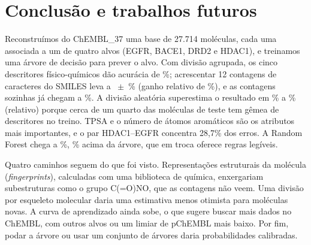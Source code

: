\section{Conclusão e trabalhos futuros}

Reconstruímos do ChEMBL\_37 uma base de 27.714 moléculas, cada uma associada a um de quatro alvos (EGFR, BACE1, DRD2 e HDAC1), e treinamos uma árvore de decisão para prever o alvo. Com divisão agrupada, os cinco descritores físico-químicos dão acurácia de \accGrupDesc\%; acrescentar 12 contagens de caracteres do SMILES leva a \accGrupAmbos~$\pm$~\sdGrupAmbos\% (ganho relativo de \ganhoAmbos\%), e as contagens sozinhas já chegam a \accGrupSmiles\%. A divisão aleatória superestima o resultado em \gapMin\% a \gapMax\% (relativo) porque cerca de um quarto das moléculas de teste tem gêmea de descritores no treino. TPSA e o número de átomos aromáticos são os atributos mais importantes, e o par HDAC1--EGFR concentra 28,7\% dos erros. A Random Forest chega a \accRF\%, \ganhoRF\% acima da árvore, que em troca oferece regras legíveis.

Quatro caminhos seguem do que foi visto. Representações estruturais da molécula (\emph{fingerprints}), calculadas com uma biblioteca de química, enxergariam subestruturas como o grupo C(=O)NO, que as contagens não veem. Uma divisão por esqueleto molecular daria uma estimativa menos otimista para moléculas novas. A curva de aprendizado ainda sobe, o que sugere buscar mais dados no ChEMBL, com outros alvos ou um limiar de pChEMBL mais baixo. Por fim, podar a árvore ou usar um conjunto de árvores daria probabilidades calibradas.

